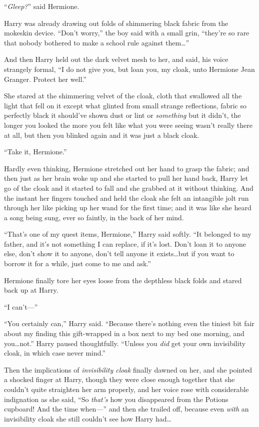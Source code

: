 “\emph{Gleep?}” said Hermione.

Harry was already drawing out folds of shimmering black fabric from the mokeskin device. “Don’t worry,” the boy said with a small grin, “they’re so rare that nobody bothered to make a school rule against them…”

And then Harry held out the dark velvet mesh to her, and said, his voice strangely formal, “I do not give you, but loan you, my cloak, unto Hermione Jean Granger. Protect her well.”

She stared at the shimmering velvet of the cloak, cloth that swallowed all the light that fell on it except what glinted from small strange reflections, fabric so perfectly black it should’ve shown dust or lint or \emph{something} but it didn’t, the longer you looked the more you felt like what you were seeing wasn’t really there at all, but then you blinked again and it was just a black cloak.

“Take it, Hermione.”

Hardly even thinking, Hermione stretched out her hand to grasp the fabric; and then just as her brain woke up and she started to pull her hand back, Harry let go of the cloak and it started to fall and she grabbed at it without thinking. And the instant her fingers touched and held the cloak she felt an intangible jolt run through her like picking up her wand for the first time; and it was like she heard a song being sung, ever so faintly, in the back of her mind.

“That’s one of my quest items, Hermione,” Harry said softly. “It belonged to my father, and it’s not something I can replace, if it’s lost. Don’t loan it to anyone else, don’t show it to anyone, don’t tell anyone it exists…but if you want to borrow it for a while, just come to me and ask.”

Hermione finally tore her eyes loose from the depthless black folds and stared back up at Harry.

“I can’t—”

“You certainly can,” Harry said. “Because there’s nothing even the tiniest bit fair about my finding this gift-wrapped in a box next to my bed one morning, and you…not.” Harry paused thoughtfully. “Unless you \emph{did} get your own invisibility cloak, in which case never mind.”

Then the implications of \emph{invisibility cloak} finally dawned on her, and she pointed a shocked finger at Harry, though they were close enough together that she couldn’t quite straighten her arm properly, and her voice rose with considerable indignation as she said, “So \emph{that’s} how you disappeared from the Potions cupboard! And the time when—” and then she trailed off, because even \emph{with} an invisibility cloak she still couldn’t see how Harry had…

